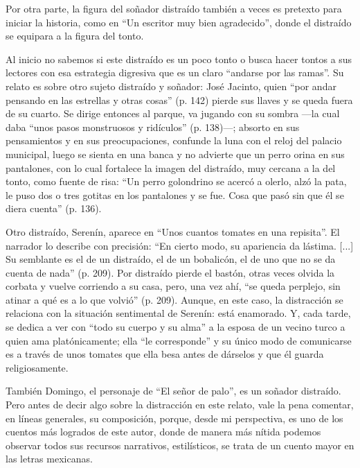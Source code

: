 \documentclass[14pt,twoside,final]{extbook} %
\begin{document}
Por otra parte, la figura del soñador distraído también a veces es pretexto para iniciar la historia, como en ``Un escritor muy bien agradecido'', donde el distraído se equipara a la figura del tonto.

Al inicio no sabemos si este distraído es un poco tonto o busca hacer tontos a sus lectores con esa estrategia digresiva que es un claro ``andarse por las ramas''. Su relato es sobre otro sujeto distraído y soñador: José Jacinto, quien ``por andar pensando en las estrellas y otras cosas'' (p. 142) pierde sus llaves y se queda fuera de su cuarto. Se dirige entonces al parque, va jugando con su sombra ---la cual daba ``unos pasos monstruosos y ridículos'' (p. 138)---; absorto en sus pensamientos y en sus preocupaciones, confunde la luna con el reloj del palacio municipal, luego se sienta en una banca y no advierte que un perro orina en sus pantalones, con lo cual fortalece la imagen del distraído, muy cercana a la del tonto, como fuente de risa: ``Un perro golondrino se acercó a olerlo, alzó la pata, le puso dos o tres gotitas en los pantalones y se fue. Cosa que pasó sin que él se diera cuenta'' (p. 136).

Otro distraído, Serenín, aparece en ``Unos cuantos tomates en una repisita''. El narrador lo describe con precisión: ``En cierto modo, su apariencia da lástima. [...] Su semblante es el de un distraído, el de un bobalicón, el de uno que no se da cuenta de nada'' (p. 209). Por distraído pierde el bastón, otras veces olvida la corbata y vuelve corriendo a su casa, pero, una vez ahí, ``se queda perplejo, sin atinar a qué es a lo que volvió'' (p. 209). Aunque, en este caso, la distracción se relaciona con la situación sentimental de Serenín: está enamorado. Y, cada tarde, se dedica a ver con ``todo su cuerpo y su alma'' a la esposa de un vecino turco a quien ama platónicamente; ella ``le corresponde'' y su único modo de comunicarse es a través de unos tomates que ella besa antes de dárselos y que él guarda religiosamente.

También Domingo, el personaje de ``El señor de palo'', es un soñador distraído. Pero antes de decir algo sobre la distracción en este relato, vale la pena comentar, en líneas generales, su composición, porque, desde mi perspectiva, es uno de los cuentos más logrados de este autor, donde de manera más nítida podemos observar todos sus recursos narrativos, estilísticos, se trata de un cuento mayor en las letras mexicanas.
\end{document}
